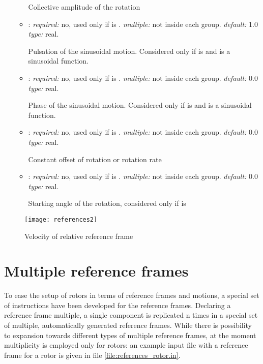\begin{itemize}
\begin{itemize}
    Collective amplitude of the rotation 
    
    \item {}: \textit{required:} no, used only if  is . \textit{multiple:} not inside each  group. \textit{default:} 1.0 \textit{type:} real.
    
    Pulsation of the sinusoidal motion. Considered only if  is  and  is a sinusoidal function.
    
        \item {}: \textit{required:} no, used only if  is . \textit{multiple:} not inside each  group. \textit{default:} 0.0 \textit{type:} real.
    
    Phase of the sinusoidal motion. Considered only if  is  and  is a sinusoidal function.
    
    \item {}: \textit{required:} no, used only if  is . \textit{multiple:} not inside each  group. \textit{default:} 0.0 \textit{type:} real.
    
    Constant offset of rotation or rotation rate
    
    \item {}: \textit{required:} no, used only if  is . \textit{multiple:} not inside each  group. \textit{default:} 0.0 \textit{type:} real.
    
    Starting angle of the rotation, considered only if  is 
    
	\end{itemize}

\end{itemize}

\begin{figure}
\centering
\texttt{[image: references2]}
\caption{Velocity of relative reference frame}
\label{fig:references2}
\end{figure}

\section{Multiple reference frames}
To ease the setup of rotors in terms of reference frames and motions, a special set of instructions have been developed for the reference frames. Declaring a reference frame multiple, a single component is replicated n times in a special set of multiple, automatically generated reference frames. 
While there is possibility to expansion towards different types of multiple reference frames, at the moment multiplicity is employed only for rotors: an example input file with a reference frame for a rotor is given in file \ref{file:references_rotor.in}. 

